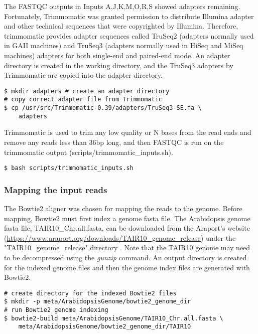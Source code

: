 \documentclass{article}
\begin{document}
\begin{sloppypar}
The FASTQC outputs in Inputs A,J,K,M,O,R,S showed adapters remaining. Fortunately, Trimmomatic was granted permission to distribute Illumina adapter and other technical sequences that were copyrighted by Illumina. Therefore, trimmomatic provides adapter sequences called TruSeq2 (adapters normally used in GAII machines) and TruSeq3 (adapters normally used in HiSeq and MiSeq machines) adapters for both single-end and paired-end mode. An adapter directory is created in the working directory, and the TruSeq3 adapters by Trimmomatic are copied into the adapter directory.

\begin{verbatim}
$ mkdir adapters # create an adapter directory
# copy correct adapter file from Trimmomatic
$ cp /usr/src/Trimmomatic-0.39/adapters/TruSeq3-SE.fa \
    adapters
\end{verbatim}

Trimmomatic is used to trim any low quality or N bases from the read ends and remove any reads less than 36bp long, and then FASTQC is run on the trimmomatic output ({\selectfont scripts/trimmomatic\_inputs.sh}). 

\begin{verbatim}
$ bash scripts/trimmomatic_inputs.sh
\end{verbatim}

\subsubsection{Mapping the input reads}

The Bowtie2 aligner was chosen for mapping the reads to the genome. Before mapping, Bowtie2 must first index a  genome fasta file. The Arabidopsis genome fasta file, TAIR10\_Chr.all.fasta, can be downloaded from the Araport's website (\url{https://www.araport.org/downloads/TAIR10_genome_release}) under the "TAIR10\_genome\_release" directory \cite{Araport11}. Note that the TAIR10 genome may need to be decompressed  using the \emph{gunzip} command. An output directory is created for the indexed genome files and then the genome index files are generated with Bowtie2.

\begin{verbatim}
# create directory for the indexed Bowtie2 files
$ mkdir -p meta/ArabidopsisGenome/bowtie2_genome_dir
# run Bowtie2 genome indexing
$ bowtie2-build meta/ArabidopsisGenome/TAIR10_Chr.all.fasta \
    meta/ArabidopsisGenome/bowtie2_genome_dir/TAIR10
\end{verbatim}


\end{sloppypar}
\end{document}
